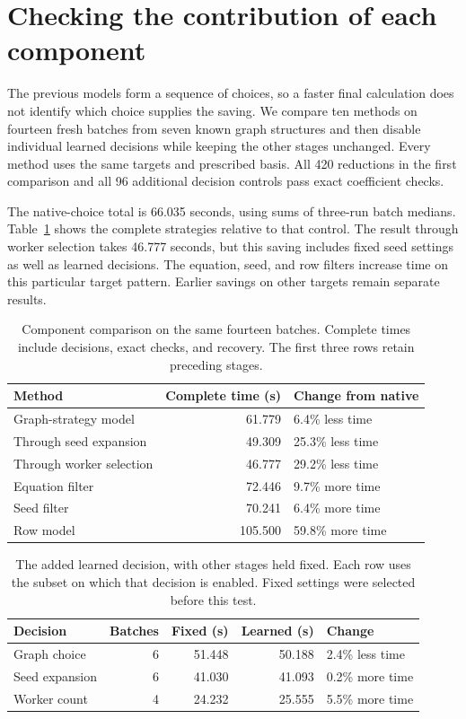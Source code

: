 \section{Checking the contribution of each component}
\label{sec:components}
The previous models form a sequence of choices, so a faster final calculation does not identify which choice supplies the saving. We compare ten methods on fourteen fresh batches from seven known graph structures and then disable individual learned decisions while keeping the other stages unchanged. Every method uses the same targets and prescribed basis. All 420 reductions in the first comparison and all 96 additional decision controls pass exact coefficient checks.

The native-choice total is 66.035 seconds, using sums of three-run batch medians. Table~\ref{tab:component-common} shows the complete strategies relative to that control. The result through worker selection takes 46.777 seconds, but this saving includes fixed seed settings as well as learned decisions. The equation, seed, and row filters increase time on this particular target pattern. Earlier savings on other targets remain separate results.

\begin{table}[!htbp]\centering\small
\caption{Component comparison on the same fourteen batches. Complete times include decisions, exact checks, and recovery. The first three rows retain preceding stages.}
\label{tab:component-common}
\begin{tabular}{@{}lrl@{}}\toprule
Method & Complete time (s) & Change from native\\\midrule
Graph-strategy model & 61.779 & 6.4\% less time\\
Through seed expansion & 49.309 & 25.3\% less time\\
Through worker selection & 46.777 & 29.2\% less time\\
Equation filter & 72.446 & 9.7\% more time\\
Seed filter & 70.241 & 6.4\% more time\\
Row model & 105.500 & 59.8\% more time\\
\bottomrule\end{tabular}\end{table}

\begin{table}[!htbp]\centering\small
\caption{The added learned decision, with other stages held fixed. Each row uses the subset on which that decision is enabled. Fixed settings were selected before this test.}
\label{tab:isolated-choices}
\begin{tabular}{@{}lrrrl@{}}\toprule
Decision & Batches & Fixed (s) & Learned (s) & Change\\\midrule
Graph choice & 6 & 51.448 & 50.188 & 2.4\% less time\\
Seed expansion & 6 & 41.030 & 41.093 & 0.2\% more time\\
Worker count & 4 & 24.232 & 25.555 & 5.5\% more time\\
\bottomrule\end{tabular}\end{table}

